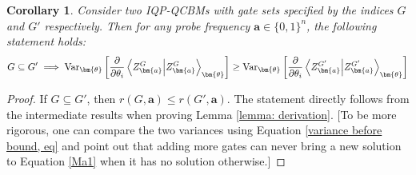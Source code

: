 \documentclass[a4paper,onecolumn,notitlepage,nofootinbib,longbibliography,superscriptaddress, floatfix, pra, aps, 10pt]{revtex4-2}
\newcommand{\cmt}[1]{{\color{blue}[#1]}}
\newcommand{\vttheta}{{\bm{\theta}}}
\newcommand{\vta}{{\bm{a}}}
\newtheorem{corollary}{Corollary}
\begin{document}
\begin{corollary}
Consider two IQP-QCBMs with gate sets specified by the indices $G$ and $G'$ respectively. Then for any probe frequency $\vta \in \{0,1\}^n$, the following statement holds: 
\begin{equation}
G \subseteq G' \implies \operatorname{Var}_\vttheta \left[\frac{\partial}{\partial \theta_i} \braket{Z^G_\vta}_\vttheta \right] \geq \operatorname{Var}_\vttheta \left[\frac{\partial}{\partial \theta_i} \braket{Z^{G'}_\vta}_\vttheta \right]
\end{equation}
\end{corollary}
\begin{proof}
If $G \subseteq G'$, then $r(G,\vta) \leq r(G',\vta)$. The statement directly follows from the intermediate results when proving Lemma \ref{lemma: derivation}. \cmt{To be more rigorous, one can compare the two variances using Equation \ref{variance before bound, eq} and point out that adding more gates can never bring a new solution to Equation \ref{Ma1} when it has no solution otherwise.}
\end{proof}
\end{document}
